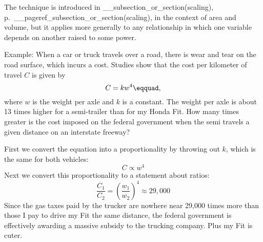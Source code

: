 The technique is introduced in __subsection_or_section(scaling), p.~__pageref_subsection_or_section(scaling), in the context of area and volume, but
it applies more generally to any relationship in which one variable depends on another raised to some power.

Example: When a car or truck travels over a road, there is wear and tear on the road surface, which incurs a cost.
Studies show that the cost per kilometer of travel $C$ is given by
\begin{equation*}
  C = k w^4\eqquad,
\end{equation*}
where $w$ is the weight per axle and $k$ is a constant.
%
%
The weight per axle is about 13 times higher for a semi-trailer than for my Honda Fit.
How many times greater is the cost imposed on the federal government when the semi travels a given distance on an interstate freeway?

\eganswer
First we convert the equation into a proportionality by throwing out $k$, which is the same for both vehicles:
\begin{equation*}
  C \propto w^4
\end{equation*}
Next we convert this proportionality to a statement about ratios:
\begin{equation*}
  \frac{C_1}{C_2} = \left(\frac{w_1}{w_2}\right)^4 \approx 29,000
\end{equation*}
Since the gas taxes paid by the trucker are nowhere near 29,000 times more than those I pay to drive my Fit the
same distance, the federal government is effectively awarding a massive subsidy to the trucking company. Plus my Fit is cuter.
